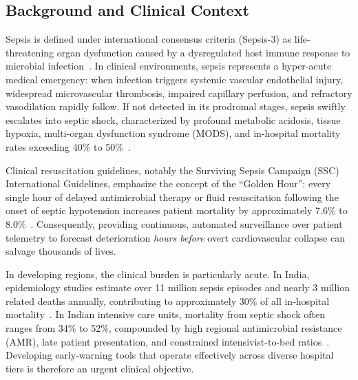 \documentclass[11pt,a4paper]{article}
\begin{document}
\subsection{Background and Clinical Context}
Sepsis is defined under international consensus criteria (Sepsis-3) as life-threatening organ dysfunction caused by a dysregulated host immune response to microbial infection~\cite{singer2016sepsis3}. In clinical environments, sepsis represents a hyper-acute medical emergency: when infection triggers systemic vascular endothelial injury, widespread microvascular thrombosis, impaired capillary perfusion, and refractory vasodilation rapidly follow. If not detected in its prodromal stages, sepsis swiftly escalates into septic shock, characterized by profound metabolic acidosis, tissue hypoxia, multi-organ dysfunction syndrome (MODS), and in-hospital mortality rates exceeding 40\% to 50\%~\cite{singer2016sepsis3,evans2021surviving,dusing2025sepsis}.

Clinical resuscitation guidelines, notably the Surviving Sepsis Campaign (SSC) International Guidelines, emphasize the concept of the ``Golden Hour'': every single hour of delayed antimicrobial therapy or fluid resuscitation following the onset of septic hypotension increases patient mortality by approximately 7.6\% to 8.0\%~\cite{evans2021surviving}. Consequently, providing continuous, automated surveillance over patient telemetry to forecast deterioration \textit{hours before} overt cardiovascular collapse can salvage thousands of lives.

In developing regions, the clinical burden is particularly acute. In India, epidemiology studies estimate over 11 million sepsis episodes and nearly 3 million related deaths annually, contributing to approximately 30\% of all in-hospital mortality~\cite{rudd2020global,chatterjee2020india,kalakoti2025fedxai}. In Indian intensive care units, mortality from septic shock often ranges from 34\% to 52\%, compounded by high regional antimicrobial resistance (AMR), late patient presentation, and constrained intensivist-to-bed ratios~\cite{chatterjee2020india}. Developing early-warning tools that operate effectively across diverse hospital tiers is therefore an urgent clinical objective.
\end{document}

